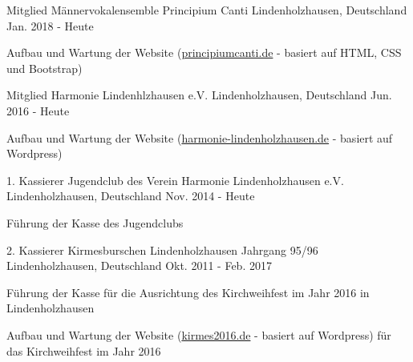 

\begin{cventries}

  \cventry
    {Mitglied} %
    {Männervokalensemble Principium Canti} %
    {Lindenholzhausen, Deutschland} %
    {Jan. 2018 - Heute} %
    {
      \begin{cvitems} %
        \item {Aufbau und Wartung der Website (\href{http://principiumcanti.de/}{principiumcanti.de} - basiert auf HTML, CSS und Bootstrap)}
      \end{cvitems}
    }

  \cventry
    {Mitglied} %
    {Harmonie Lindenhlzhausen e.V.} %
    {Lindenholzhausen, Deutschland} %
    {Jun. 2016 - Heute} %
    {
      \begin{cvitems} %
        \item {Aufbau und Wartung der Website (\href{http://chorhp.harmonie-festival.de/}{harmonie-lindenholzhausen.de} - basiert auf Wordpress)}
      \end{cvitems}
    }

  \cventry
    {1. Kassierer} %
    {Jugendclub des Verein Harmonie Lindenholzhausen e.V.} %
    {Lindenholzhausen, Deutschland} %
    {Nov. 2014 - Heute} %
    {
      \begin{cvitems} %
       \item {Führung der Kasse des Jugendclubs}
      \end{cvitems}
    }

  \cventry
    {2. Kassierer} %
    {Kirmesburschen Lindenholzhausen Jahrgang 95/96} %
    {Lindenholzhausen, Deutschland} %
    {Okt. 2011 - Feb. 2017} %
    {
      \begin{cvitems} %
        \item {Führung der Kasse für die Ausrichtung des Kirchweihfest im Jahr 2016 in Lindenholzhausen}
        \item {Aufbau und Wartung der Website (\href{http://kirmes2016.de/}{kirmes2016.de} - basiert auf Wordpress) für das Kirchweihfest im Jahr 2016}
      \end{cvitems}
    }

\end{cventries}
